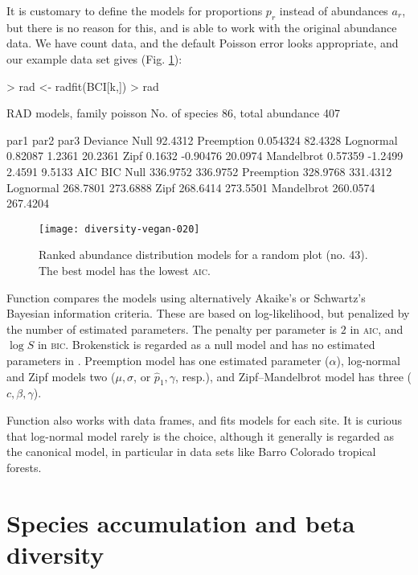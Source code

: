 \documentclass[a4paper,10pt,twocolumn]{article}
\begin{document}
It is customary to define the models for proportions $p_r$ instead of
abundances $a_r$, but there is no reason for this, and 
is able to work with the original abundance data.  We have count data,
and the default Poisson error looks appropriate, and our example data
set gives (Fig. \ref{fig:rad}):
\begin{Schunk}
\begin{Sinput}
> rad <- radfit(BCI[k,])
> rad
\end{Sinput}
\begin{Soutput}
RAD models, family poisson 
No. of species 86, total abundance 407

           par1      par2     par3    Deviance
Null                                   92.4312
Preemption  0.054324                   82.4328
Lognormal   0.82087   1.2361           20.2361
Zipf        0.1632   -0.90476          20.0974
Mandelbrot  0.57359  -1.2499   2.4591   9.5133
           AIC      BIC     
Null       336.9752 336.9752
Preemption 328.9768 331.4312
Lognormal  268.7801 273.6888
Zipf       268.6414 273.5501
Mandelbrot 260.0574 267.4204
\end{Soutput}
\end{Schunk}
\begin{figure}
\texttt{[image: diversity-vegan-020]}
\caption{Ranked abundance distribution models for a random plot
  (no. 43).  The best model has the lowest \textsc{aic}.}
\label{fig:rad}
\end{figure}

Function  compares the models using alternatively
Akaike's or Schwartz's Bayesian information criteria.  These are based
on log-likelihood, but penalized by the number of estimated
parameters.  The penalty per parameter is $2$ in \textsc{aic}, and
$\log S$ in \textsc{bic}.  Brokenstick is regarded as a null model and
has no estimated parameters in .  Preemption model has
one estimated parameter ($\alpha$), log-normal and Zipf models two
($\mu, \sigma$, or $\hat p_1, \gamma$, resp.), and Zipf--Mandelbrot
model has three ($c, \beta, \gamma$).

Function  also works with data frames, and fits models
for each site. It is curious that log-normal model rarely is the
choice, although it generally is regarded as the canonical model, in
particular in data sets like Barro Colorado tropical forests.

\section{Species accumulation and beta diversity}
\end{document}
